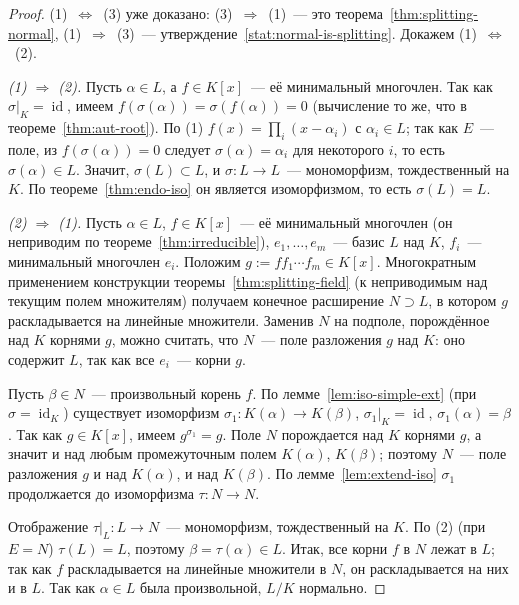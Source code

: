 \documentclass[12pt]{article}
\begin{document}
	\begin{proof}
		(1)~$\Leftrightarrow$~(3) уже доказано: (3)~$\Rightarrow$~(1)~--- это теорема~\ref{thm:splitting-normal}, (1)~$\Rightarrow$~(3)~--- утверждение~\ref{stat:normal-is-splitting}. Докажем (1)~$\Leftrightarrow$~(2).

		\emph{(1) $\Rightarrow$ (2).} Пусть $\alpha \in L$, а $f \in K[x]$~--- её минимальный многочлен. Так как $\sigma|_K = \operatorname{id}$, имеем $f(\sigma(\alpha)) = \sigma(f(\alpha)) = 0$ (вычисление то же, что в теореме~\ref{thm:aut-root}). По (1) $f(x) = \prod_i (x - \alpha_i)$ с $\alpha_i \in L$; так как $E$~--- поле, из $f(\sigma(\alpha)) = 0$ следует $\sigma(\alpha) = \alpha_i$ для некоторого $i$, то есть $\sigma(\alpha) \in L$. Значит, $\sigma(L) \subset L$, и $\sigma: L \to L$~--- мономорфизм, тождественный на $K$. По теореме~\ref{thm:endo-iso} он является изоморфизмом, то есть $\sigma(L) = L$.

		\emph{(2) $\Rightarrow$ (1).} Пусть $\alpha \in L$, $f \in K[x]$~--- её минимальный многочлен (он неприводим по теореме~\ref{thm:irreducible}), $e_1, \ldots, e_m$~--- базис $L$ над $K$, $f_i$~--- минимальный многочлен $e_i$. Положим $g := f f_1 \cdots f_m \in K[x]$. Многократным применением конструкции теоремы~\ref{thm:splitting-field} (к неприводимым над текущим полем множителям) получаем конечное расширение $N \supset L$, в котором $g$ раскладывается на линейные множители. Заменив $N$ на подполе, порождённое над $K$ корнями $g$, можно считать, что $N$~--- поле разложения $g$ над $K$: оно содержит $L$, так как все $e_i$~--- корни $g$.

		Пусть $\beta \in N$~--- произвольный корень $f$. По лемме~\ref{lem:iso-simple-ext} (при $\sigma = \operatorname{id}_K$) существует изоморфизм $\sigma_1: K(\alpha) \to K(\beta)$, $\sigma_1|_K = \operatorname{id}$, $\sigma_1(\alpha) = \beta$. Так как $g \in K[x]$, имеем $g^{\sigma_1} = g$. Поле $N$ порождается над $K$ корнями $g$, а значит и над любым промежуточным полем $K(\alpha)$, $K(\beta)$; поэтому $N$~--- поле разложения $g$ и над $K(\alpha)$, и над $K(\beta)$. По лемме~\ref{lem:extend-iso} $\sigma_1$ продолжается до изоморфизма $\tau: N \to N$.

		Отображение $\tau|_L: L \to N$~--- мономорфизм, тождественный на $K$. По (2) (при $E = N$) $\tau(L) = L$, поэтому $\beta = \tau(\alpha) \in L$. Итак, все корни $f$ в $N$ лежат в $L$; так как $f$ раскладывается на линейные множители в $N$, он раскладывается на них и в $L$. Так как $\alpha \in L$ была произвольной, $L/K$ нормально.
	\end{proof}
\end{document}
